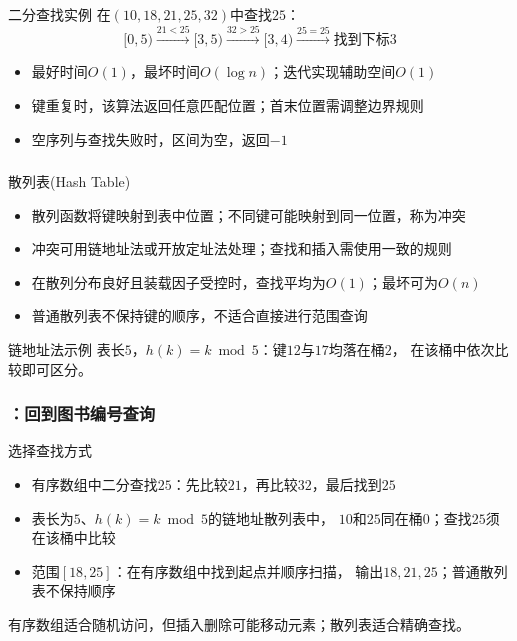 \begin{frame}
    \frametitle{\insertsectionhead}
    \begin{exampleblock}{二分查找实例}
        在$(10,18,21,25,32)$中查找$25$：
        \[
            [0,5)\xrightarrow{21<25}[3,5)
            \xrightarrow{32>25}[3,4)
            \xrightarrow{25=25}\text{找到下标}3
        \]
    \end{exampleblock}
    \begin{itemize}
        \item 最好时间$O(1)$，最坏时间$O(\log n)$；迭代实现辅助空间$O(1)$
        \item 键重复时，该算法返回任意匹配位置；首末位置需调整边界规则
        \item 空序列与查找失败时，区间为空，返回$-1$
    \end{itemize}
\end{frame}

\begin{frame}
    \frametitle{\insertsectionhead}
    \begin{block}{散列表(Hash Table)}
        \begin{itemize}
            \item 散列函数将键映射到表中位置；不同键可能映射到同一位置，称为冲突
            \item 冲突可用链地址法或开放定址法处理；查找和插入需使用一致的规则
            \item 在散列分布良好且装载因子受控时，查找平均为$O(1)$；最坏可为$O(n)$
            \item 普通散列表不保持键的顺序，不适合直接进行范围查询
        \end{itemize}
    \end{block}
    \begin{exampleblock}{链地址法示例}
        表长$5$，$h(k)=k\bmod 5$：键$12$与$17$均落在桶$2$，
        在该桶中依次比较即可区分。
    \end{exampleblock}
\end{frame}



\begin{frame}
    \frametitle{\insertsectionhead：回到图书编号查询}
    \begin{exampleblock}{选择查找方式}
        \begin{itemize}
            \item 有序数组中二分查找$25$：先比较$21$，再比较$32$，最后找到$25$
            \item 表长为$5$、$h(k)=k\bmod5$的链地址散列表中，
                  $10$和$25$同在桶$0$；查找$25$须在该桶中比较
            \item 范围$[18,25]$：在有序数组中找到起点并顺序扫描，
                  输出$18,21,25$；普通散列表不保持顺序
        \end{itemize}
    \end{exampleblock}
    有序数组适合随机访问，但插入删除可能移动元素；散列表适合精确查找。
\end{frame}

